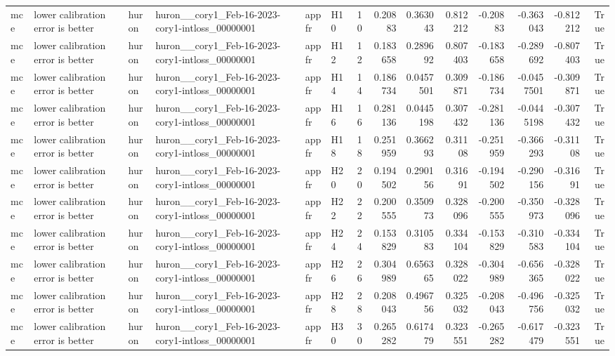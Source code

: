 \begin{longtable}{llllllrrrrrrrr}
mce & lower calibration error is better & huron & huron\_\_cory1\_Feb-16-2023-cory1-intloss\_00000001 & appfr & H10 & 10 & 0.20883 & 0.363043 & 0.812212 & -0.20883 & -0.363043 & -0.812212 & True \\
mce & lower calibration error is better & huron & huron\_\_cory1\_Feb-16-2023-cory1-intloss\_00000001 & appfr & H12 & 12 & 0.183658 & 0.289692 & 0.807403 & -0.183658 & -0.289692 & -0.807403 & True \\
mce & lower calibration error is better & huron & huron\_\_cory1\_Feb-16-2023-cory1-intloss\_00000001 & appfr & H14 & 14 & 0.186734 & 0.0457501 & 0.309871 & -0.186734 & -0.0457501 & -0.309871 & True \\
mce & lower calibration error is better & huron & huron\_\_cory1\_Feb-16-2023-cory1-intloss\_00000001 & appfr & H16 & 16 & 0.281136 & 0.0445198 & 0.307432 & -0.281136 & -0.0445198 & -0.307432 & True \\
mce & lower calibration error is better & huron & huron\_\_cory1\_Feb-16-2023-cory1-intloss\_00000001 & appfr & H18 & 18 & 0.251959 & 0.366293 & 0.31108 & -0.251959 & -0.366293 & -0.31108 & True \\
mce & lower calibration error is better & huron & huron\_\_cory1\_Feb-16-2023-cory1-intloss\_00000001 & appfr & H20 & 20 & 0.194502 & 0.290156 & 0.31691 & -0.194502 & -0.290156 & -0.31691 & True \\
mce & lower calibration error is better & huron & huron\_\_cory1\_Feb-16-2023-cory1-intloss\_00000001 & appfr & H22 & 22 & 0.200555 & 0.350973 & 0.328096 & -0.200555 & -0.350973 & -0.328096 & True \\
mce & lower calibration error is better & huron & huron\_\_cory1\_Feb-16-2023-cory1-intloss\_00000001 & appfr & H24 & 24 & 0.153829 & 0.310583 & 0.334104 & -0.153829 & -0.310583 & -0.334104 & True \\
mce & lower calibration error is better & huron & huron\_\_cory1\_Feb-16-2023-cory1-intloss\_00000001 & appfr & H26 & 26 & 0.304989 & 0.656365 & 0.328022 & -0.304989 & -0.656365 & -0.328022 & True \\
mce & lower calibration error is better & huron & huron\_\_cory1\_Feb-16-2023-cory1-intloss\_00000001 & appfr & H28 & 28 & 0.208043 & 0.496756 & 0.325032 & -0.208043 & -0.496756 & -0.325032 & True \\
mce & lower calibration error is better & huron & huron\_\_cory1\_Feb-16-2023-cory1-intloss\_00000001 & appfr & H30 & 30 & 0.265282 & 0.617479 & 0.323551 & -0.265282 & -0.617479 & -0.323551 & True \\

\end{longtable}
